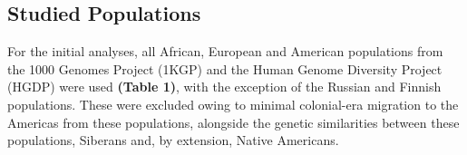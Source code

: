 \documentclass[11pt]{article}
\begin{document}


\subsection{Studied Populations}


For the initial analyses, all African, European and American populations from the 1000 Genomes Project (1KGP) and the Human Genome Diversity Project (HGDP) were used \textbf{(Table 1)}, with the exception of the Russian and Finnish populations. These were excluded owing to minimal colonial-era migration to the Americas from these populations, alongside the genetic similarities between these populations, Siberans and, by extension, Native Americans.
\end{document}
